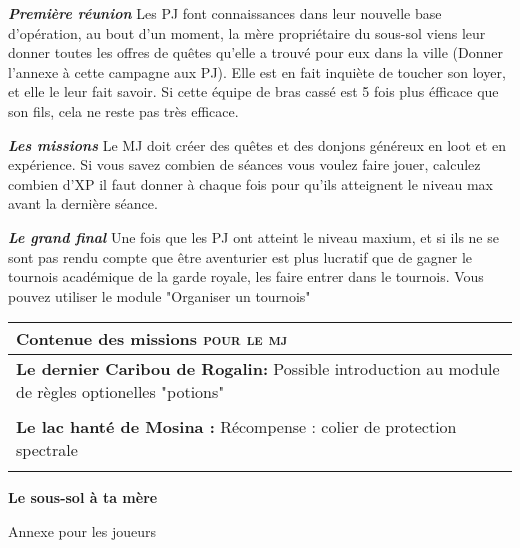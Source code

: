 \documentclass[11pt]{article} %
\begin{document}
\noindent \textbf{\emph{Première réunion}}\newline
Les PJ font connaissances dans leur nouvelle base d'opération, au bout d'un moment, la mère propriétaire du sous-sol viens leur donner toutes les offres de quêtes qu'elle a trouvé pour eux dans la ville (Donner l'annexe à cette campagne aux PJ). Elle est en fait inquiète de toucher son loyer, et elle le leur fait savoir. Si cette équipe de bras cassé est 5 fois plus éfficace que son fils, cela ne reste pas très efficace.\newline\newline


\noindent \textbf{\emph{Les missions}}\newline
Le MJ doit créer des quêtes et des donjons généreux en loot et en expérience. Si vous savez combien de séances vous voulez faire jouer, calculez combien d'XP il faut donner à chaque fois pour qu'ils atteignent le niveau max avant la dernière séance.\newline\newline


\noindent \textbf{\emph{Le grand final}}\newline
Une fois que les PJ ont atteint le niveau maxium, et si ils ne se sont pas rendu compte que être aventurier est plus lucratif que de gagner le tournois académique de la garde royale, les faire entrer dans le tournois. Vous pouvez utiliser le module "Organiser un tournois"





\newpage
\begin{tabularx}{\linewidth}{X}
\hline

    \textbf{Contenue des missions \textsc{pour le mj}}\\\hline
    \textbf{Le dernier Caribou de Rogalin:}\newline
    Possible introduction au module de règles optionelles "potions"\\\\\hline
    \textbf{Le lac hanté de Mosina :}\newline
    Récompense : colier de protection spectrale\\\\

\hline
\end{tabularx}






\newpage
\begin{center}
    \textbf{Le sous-sol à ta mère}

    Annexe pour les joueurs
\end{center}
\end{document}

